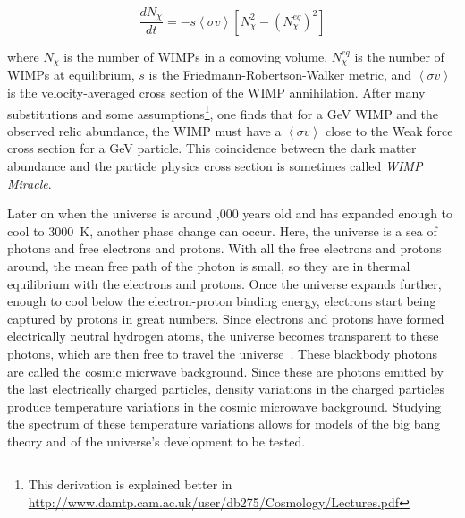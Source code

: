    \begin{equation}\label{eqn:boltz_dm}
      \frac{dN_\chi}{dt} = -s \left \langle \sigma v \right \rangle \left [ N_\chi^2 - \left ( N_\chi^{eq} \right )^2 \right ]
    \end{equation}
    
    where $N_\chi$ is the number of WIMPs in a comoving volume, $N_\chi^{eq}$ is the number of WIMPs at equilibrium, $s$ is the Friedmann-Robertson-Walker metric, and $\left \langle \sigma v \right \rangle$ is the velocity-averaged cross section of the WIMP annihilation.
    After many substitutions and some assumptions\footnote{This derivation is explained better in \url{http://www.damtp.cam.ac.uk/user/db275/Cosmology/Lectures.pdf}}, one finds that for a \nicetilde{}GeV WIMP and the observed relic abundance, the WIMP must have a $\left \langle \sigma v \right \rangle$ close to the Weak force cross section for a \nicetilde{}GeV particle.
    This coincidence between the dark matter abundance and the particle physics cross section is sometimes called \textit{WIMP Miracle}.
    
    
    Later on when the universe is around ,000 years old and has expanded enough to cool to \nicetilde\SI{3000}{K}, another phase change can occur.
    Here, the universe is a sea of photons and free electrons and protons.
    With all the free electrons and protons around, the mean free path of the photon is small, so they are in thermal equilibrium with the electrons and protons.
    Once the universe expands further, enough to cool below the electron-proton binding energy, electrons start being captured by protons in great numbers.
    Since electrons and protons have formed electrically neutral hydrogen atoms, the universe becomes transparent to these photons, which are then free to travel the universe~\cite{planck2015,theEarlyUniverse,CMBFundamentals,CMBFlat}.
    These blackbody photons are called the cosmic micrwave background.
    Since these are photons emitted by the last electrically charged particles, density variations in the charged particles produce temperature variations in the cosmic microwave background.
    Studying the spectrum of these temperature variations allows for models of the big bang theory and of the universe's development to be tested.


